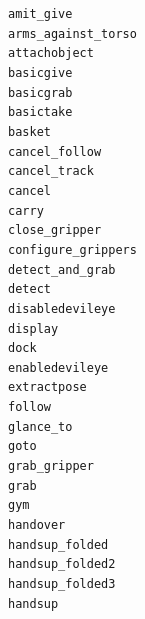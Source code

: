 \documentclass[xcolor=table]{beamer}
\begin{document}





{
\begin{frame}{}
    \begin{multicols}{4}
\scriptsize

{\tt amit\_give} \\
{\tt arms\_against\_torso} \\
{\tt attachobject} \\
{\tt basicgive} \\
{\tt basicgrab} \\
{\tt basictake} \\
{\tt basket} \\
{\tt cancel\_follow} \\
{\tt cancel\_track} \\
{\tt cancel} \\
{\tt carry} \\
{\tt close\_gripper} \\
{\tt configure\_grippers} \\
{\tt detect\_and\_grab} \\
{\tt detect} \\
{\tt disabledevileye} \\
{\tt display} \\
{\tt dock} \\
{\tt enabledevileye} \\
{\tt extractpose} \\
{\tt follow} \\
{\tt glance\_to} \\
{\tt goto} \\
{\tt grab\_gripper} \\
{\tt grab} \\
{\tt gym} \\
{\tt handover} \\
{\tt handsup\_folded} \\
{\tt handsup\_folded2} \\
{\tt handsup\_folded3} \\
{\tt handsup} \\

\end{multicols}
\end{frame}}
\end{document}
